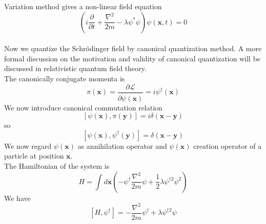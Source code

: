 Variation method gives a non-linear field equation
\[\left (i\frac{\partial }{\partial t} + \frac{\nabla^2}{2m} -\lambda \psi^*\psi\right) \psi(\bm{x},t) = 0\]\\
Now we quantize the Schrödinger field by canonical quantization method. A more formal discussion on the motivation and validity of canonical quantization will be discussed in relativistic quantum field theory.\\
The canonically conjugate momenta is
\[\pi(\bm{x}) = \frac{\partial \mathcal{L}}{\partial \dot{\psi}(\bm{x})} = i\psi^{\dagger}(\bm{x})\] 
We now introduce canonical commutation relation
\[[\psi(\bm{x}),\pi(\bm{y})] = i\delta(\bm{x}-\bm{y})\]
so
\[[\psi(\bm{x}),\psi^{\dagger}(\bm{y})] = \delta(\bm{x}-\bm{y})\]
We now regard $\psi(\bm{x})$ as annihilation operator and $\psi(\bm{x})$ creation operator of a particle at position $\bm{x}$. \\
The Hamiltonian of the system is
\[H = \int d\bm{x} \left( -\psi^{\dagger}\frac{\nabla^2}{2m}\psi + \frac{1}{2}\lambda\psi^{\dagger 2}\psi^2 \right)\]
We have
\[[H,\psi^{\dagger}] = -\frac{\nabla^2}{2m}\psi^{\dagger} + \lambda \psi^{\dagger 2}\psi\]

